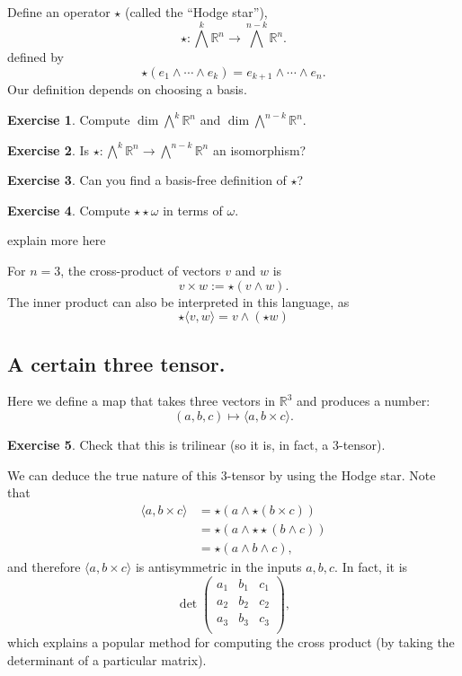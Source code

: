 \documentclass[12pt]{article}
\theoremstyle{definition}
\newtheorem*{exercise}{Exercise}
\newcommand{\R}{\mathbb{R}}
\begin{document}
Define an operator $\star$ (called the ``Hodge star''),
$$
\star : \bigwedge^k \R^n \to \bigwedge^{n-k} \R^n.
$$
defined by
$$\star \left( e_1 \wedge \cdots \wedge e_k \right) = e_{k+1} \wedge \cdots \wedge
e_n.$$
Our definition depends on choosing a basis.

\begin{exercise}
Compute $\dim \bigwedge^k \R^n$ and $\dim \bigwedge^{n-k} \R^n$.
\end{exercise}

\begin{exercise}
Is $\star : \bigwedge^k \R^n \to \bigwedge^{n-k} \R^n$ an isomorphism?
\end{exercise}

\begin{exercise}
Can you find a basis-free definition of $\star$?
\end{exercise}

\begin{exercise}
Compute $\star \star \omega$ in terms of $\omega$.
\end{exercise}

explain more here

For $n = 3$, the cross-product of vectors $v$ and $w$ is
$$
v \times w := \star \left( v \wedge w \right).
$$
The inner product can also be interpreted in this language, as
$$
\star \langle v, w \rangle = v \wedge (\star w)
$$

\subsection*{A certain three tensor.}

Here we define a map that takes three vectors in $\R^3$ and produces a number:
$$
\left( a, b, c \right) \mapsto \langle a, b \times c \rangle.
$$
\begin{exercise}
Check that this is trilinear (so it is, in fact, a $3$-tensor).
\end{exercise}
We can deduce the true nature of this 3-tensor by using the Hodge
star.  Note that
\begin{align*}
\langle a, b \times c \rangle
&= \star \left( a \wedge \star \left( b \times c \right) \right) \\
&= \star \left( a \wedge \star \star \left (b \wedge c \right ) \right) \\
&= \star \left( a \wedge b \wedge c \right),
\end{align*}
and therefore $\langle a, b \times c \rangle$ is antisymmetric in the
inputs $a,b,c$.  In fact, it is
$$
\det \begin{pmatrix}
a_1 & b_1 & c_1 \\
a_2 & b_2 & c_2 \\
a_3 & b_3 & c_3 \\
\end{pmatrix},
$$
which explains a popular method for computing the cross product (by
taking the determinant of a particular matrix).
\end{document}
